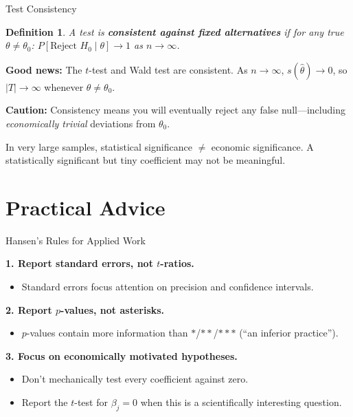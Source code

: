 \documentclass[handout, aspectratio=169]{beamer}
\newtheorem{defn}{Definition}
\numberwithin{equation}{section}
\begin{document}
\begin{frame}{Test Consistency}

\begin{defn}
A test is \textbf{consistent against fixed alternatives} if for any true $\theta \neq \theta_0$:
$P[\text{Reject } H_0 \mid \theta] \to 1$ as $n \to \infty$.
\end{defn}

\pause
\smallskip

\textbf{Good news:} The $t$-test and Wald test are consistent.  As $n \to \infty$, $s(\hat{\theta}) \to 0$, so $|T| \to \infty$ whenever $\theta \neq \theta_0$.

\pause
\smallskip

\textbf{Caution:}  Consistency means you will eventually reject any false null---including \emph{economically trivial} deviations from $\theta_0$.

\begin{tcolorbox}[colback=red!5, colframe=red!50]
In very large samples, statistical significance $\neq$ economic significance. A statistically significant but tiny coefficient may not be meaningful.
\end{tcolorbox}
\end{frame}

\section{Practical Advice}
\setcounter{subsection}{1}

\begin{frame}{Hansen's Rules for Applied Work}

\textbf{1. Report standard errors, not $t$-ratios.}
\begin{itemize}
\item Standard errors focus attention on precision and confidence intervals.
\end{itemize}

\pause
\smallskip

\textbf{2. Report $p$-values, not asterisks.}
\begin{itemize}
\item $p$-values contain more information than $*$/$**$/$***$ (``an inferior practice'').
\end{itemize}

\pause
\smallskip

\textbf{3. Focus on economically motivated hypotheses.}
\begin{itemize}
\item Don't mechanically test every coefficient against zero.
\item Report the $t$-test for $\beta_j = 0$ when this is a scientifically interesting question.
\end{itemize}
\end{frame}
\end{document}
